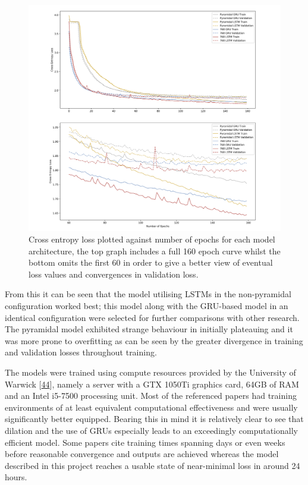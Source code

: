 \documentclass[12pt,]{article}
\begin{document}
\begin{figure}
\centering
\includegraphics{Images/loss.png}
\caption{Cross entropy loss plotted against number of epochs for each
model architecture, the top graph includes a full 160 epoch curve whilst
the bottom omits the first 60 in order to give a better view of eventual
loss values and convergences in validation loss.}
\end{figure}

From this it can be seen that the model utilising LSTMs in the
non-pyramidal configuration worked best; this model along with the
GRU-based model in an identical configuration were selected for further
comparisons with other research. The pyramidal model exhibited strange
behaviour in initially plateauing and it was more prone to overfitting
as can be seen by the greater divergence in training and validation
losses throughout training.

The models were trained using compute resources provided by the
University of Warwick
{[}\protect\hyperlink{ref-warwickcomputenodes}{44}{]}, namely a server
with a GTX 1050Ti graphics card, 64GB of RAM and an Intel i5-7500
processing unit. Most of the referenced papers had training environments
of at least equivalent computational effectiveness and were usually
significantly better equipped. Bearing this in mind it is relatively
clear to see that dilation and the use of GRUs especially leads to an
exceedingly computationally efficient model. Some papers cite training
times spanning days or even weeks before reasonable convergence and
outputs are achieved whereas the model described in this project reaches
a usable state of near-minimal loss in around 24 hours.
\end{document}
